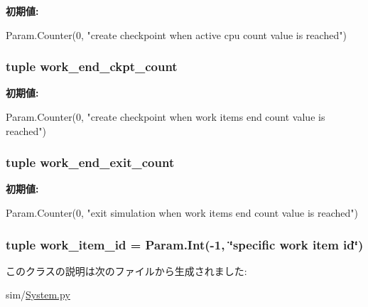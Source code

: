{\bfseries 初期値:}
\begin{DoxyCode}
Param.Counter(0,
        "create checkpoint when active cpu count value is reached")
\end{DoxyCode}
\hypertarget{classSystem_1_1System_a41ca1424c9033eaa34c85ac0e025e742}{
\subsubsection[{work\_\-end\_\-ckpt\_\-count}]{\setlength{\rightskip}{0pt plus 5cm}tuple {\bf work\_\-end\_\-ckpt\_\-count}}}
\label{classSystem_1_1System_a41ca1424c9033eaa34c85ac0e025e742}
{\bfseries 初期値:}
\begin{DoxyCode}
Param.Counter(0,
        "create checkpoint when work items end count value is reached")
\end{DoxyCode}
\hypertarget{classSystem_1_1System_a56545cda6c4090e0fc3d5836bc6912bd}{
\subsubsection[{work\_\-end\_\-exit\_\-count}]{\setlength{\rightskip}{0pt plus 5cm}tuple {\bf work\_\-end\_\-exit\_\-count}}}
\label{classSystem_1_1System_a56545cda6c4090e0fc3d5836bc6912bd}
{\bfseries 初期値:}
\begin{DoxyCode}
Param.Counter(0,
        "exit simulation when work items end count value is reached")
\end{DoxyCode}
\hypertarget{classSystem_1_1System_aec87888c90a4acd146cbc30d2657de7f}{
\subsubsection[{work\_\-item\_\-id}]{\setlength{\rightskip}{0pt plus 5cm}tuple {\bf work\_\-item\_\-id} = Param.Int(-\/1, \char`\"{}specific work item id\char`\"{})}}
\label{classSystem_1_1System_aec87888c90a4acd146cbc30d2657de7f}


このクラスの説明は次のファイルから生成されました:\begin{DoxyCompactItemize}
\item 
sim/\hyperlink{System_8py}{System.py}\end{DoxyCompactItemize}
